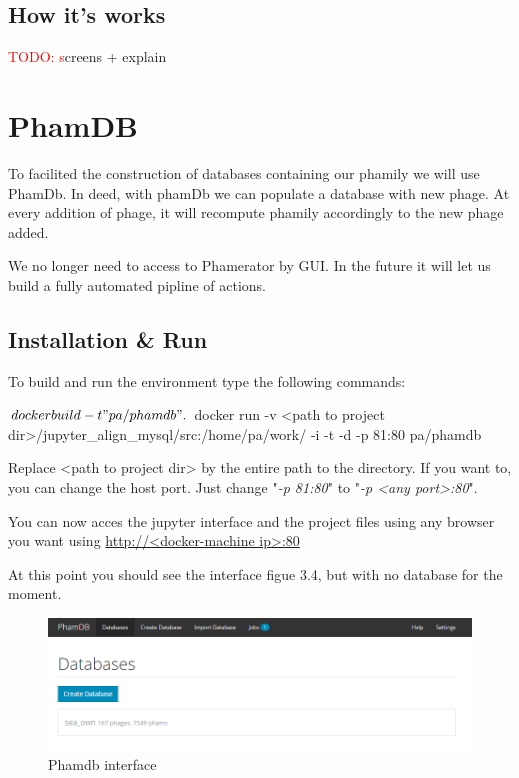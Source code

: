 \documentclass[a4paper,11pt]{report}
\newcommand{\todo}[1]{\textcolor{red}{TODO: #1}\PackageWarning{TODO:}{#1!}}
\begin{document}
\subsection{How it's works}
\todo screens + explain

\section{PhamDB}
To facilited the construction of databases containing our phamily we will use PhamDb. In deed, with phamDb we can populate a database with new phage. At every addition of phage, it will recompute phamily accordingly to the new phage added. 

We no longer need to access to Phamerator by GUI. In the future it will let us build a fully automated pipline of actions.

\subsection{Installation \& Run}
To build and run the environment type the following commands:
\begin{javacode}
$ docker build -t "pa/phamdb" .
$ docker run -v <path to project dir>/jupyter_align_mysql/src:/home/pa/work/ -i -t -d -p 81:80 pa/phamdb
\end{javacode}

Replace <path to project dir> by the entire path to the directory. If you want to, you can change the host port. Just change "\textit{-p 81:80}" to "\textit{-p <any port>:80}".

You can now acces the jupyter interface and the project files using any browser you want using \url{http://<docker-machine ip>:80}

At this point you should see the interface figue 3.4, but with no database for the moment.

\begin{figure}[H] 
	\begin{center}
		\includegraphics[scale=0.45]{img/phamdb}
		\caption{Phamdb interface}
	\end{center}
\end{figure}
\end{document}
